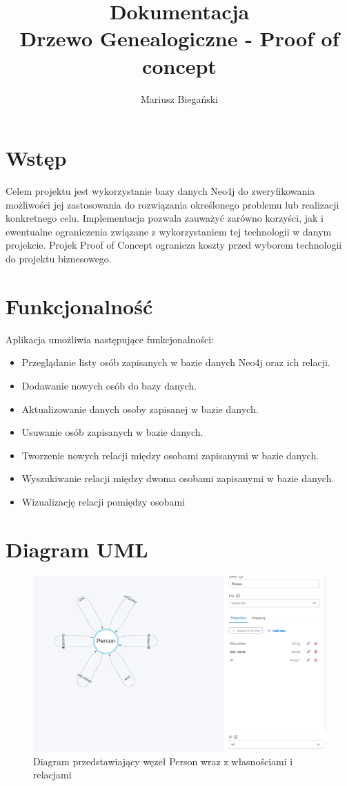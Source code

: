 \documentclass[a4paper]{article}
\title{Dokumentacja\\ Drzewo Genealogiczne - Proof of concept}
\author{Mariusz Biegański}
\date{}
\begin{document}
\maketitle

\section{Wstęp}
Celem projektu jest wykorzystanie bazy danych Neo4j do zweryfikowania możliwości 
jej zastosowania do rozwiązania określonego problemu lub realizacji konkretnego 
celu. Implementacja pozwala zauważyć zarówno korzyści, jak i ewentualne 
ograniczenia związane z wykorzystaniem tej technologii w danym projekcie. 
Projek Proof of Concept ogranicza koszty przed wyborem technologii do 
projektu biznesowego.

\section{Funkcjonalność}
Aplikacja umożliwia następujące funkcjonalności:
\begin{itemize}
\item Przeglądanie listy osób zapisanych w bazie danych Neo4j oraz ich relacji.
\item Dodawanie nowych osób do bazy danych.
\item Aktualizowanie danych osoby zapisanej w bazie danych.
\item Usuwanie osób zapisanych w bazie danych.
\item Tworzenie nowych relacji między osobami zapisanymi w bazie danych.
\item Wyszukiwanie relacji między dwoma osobami zapisanymi w bazie danych.
\item Wizualizację relacji pomiędzy osobami
\end{itemize}

\section{Diagram UML}

\begin{figure}[H]
	\centering
	\includegraphics[width=\linewidth]{diagram.png}
	\caption{Diagram przedstawiający węzeł Person wraz z własnościami i relacjami}
\end{figure}
\end{document}

